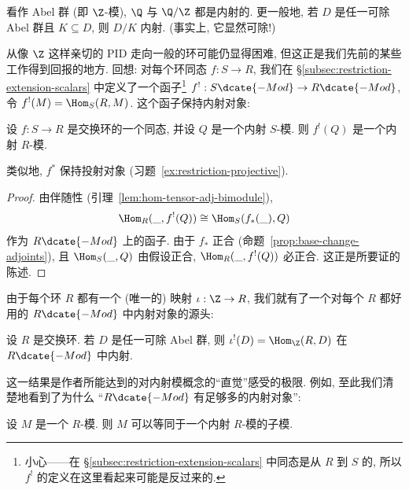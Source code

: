 \begin{example}\label{ex:divisible-abelian-injective}
看作 Abel 群 (即 $\Z$-模), $\Q$ 与 $\Q/\Z$ 都是内射的. 更一般地, 若 $D$ 是任一可除 Abel 群且 $K\subseteq D$, 则 $D/K$ 内射. (事实上, 它显然可除!)
\end{example}

从像 $\Z$ 这样亲切的 PID 走向一般的环可能仍显得困难, 但这正是我们先前的某些工作得到回报的地方. 回想: 对每个环同态 $f:S\to R$, 我们在 \S\ref{subsec:restriction-extension-scalars} 中定义了一个函子\footnote{小心——在 \S\ref{subsec:restriction-extension-scalars} 中同态是从 $R$ 到 $S$ 的, 所以 $f^!$ 的定义在这里看起来可能是反过来的.} $f^!:S\dcate{-Mod}\to R\dcate{-Mod}$, 令 $f^!(M)=\Hom_S(R,M)$. 这个函子保持内射对象:

\begin{lemma}\label{lem:base-change-injective}
设 $f:S\to R$ 是交换环的一个同态, 并设 $Q$ 是一个内射 $S$-模. 则 $f^!(Q)$ 是一个内射 $R$-模.
\end{lemma}

\begin{remark}\label{rmk:base-change-projective}
类似地, $f^*$ 保持投射对象 (习题~\ref{ex:restriction-projective}).
\end{remark}

\begin{proof}
由伴随性 (引理~\ref{lem:hom-tensor-adj-bimodule}),
\[
\Hom_R(\_,f^!(Q))\cong\Hom_S(f_*(\_),Q)
\]
作为 $R\dcate{-Mod}$ 上的函子. 由于 $f_*$ 正合 (命题~\ref{prop:base-change-adjoints}), 且 $\Hom_S(\_,Q)$ 由假设正合, $\Hom_R(\_,f^!(Q))$ 必正合. 这正是所要证的陈述.
\end{proof}

由于每个环 $R$ 都有一个 (唯一的) 映射 $\iota:\Z\to R$, 我们就有了一个对每个 $R$ 都好用的 $R\dcate{-Mod}$ 中内射对象的源头:

\begin{corollary}\label{cor:hom-z-injective}
设 $R$ 是交换环. 若 $D$ 是任一可除 Abel 群, 则 $\iota^!(D)=\Hom_\Z(R,D)$ 在 $R\dcate{-Mod}$ 中内射.
\end{corollary}

这一结果是作者所能达到的对内射模概念的``直觉''感受的极限. 例如, 至此我们清楚地看到了为什么 ``$R\dcate{-Mod}$ 有足够多的内射对象'':

\begin{corollary}\label{cor:enough-injectives}
设 $M$ 是一个 $R$-模. 则 $M$ 可以等同于一个内射 $R$-模的子模.
\end{corollary}

